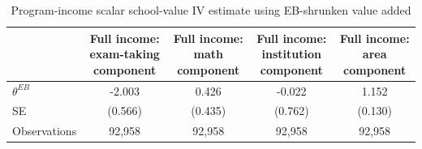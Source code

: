 \begin{table}[!htbp]
\centering
\caption{Program-income scalar school-value IV estimate using EB-shrunken value added}
\label{tab:scalar_school_value_iv_program_income_expected_va_eb}
\begin{tabular}{lcccc}
\toprule
 & Full income: exam-taking component & Full income: math component & Full income: institution component & Full income: area component \\
\midrule
$\theta^{EB}$ & -2.003 & 0.426 & -0.022 & 1.152 \\
SE & (0.566) & (0.435) & (0.762) & (0.130) \\
Observations & 92,958 & 92,958 & 92,958 & 92,958 \\
\bottomrule
\end{tabular}
\end{table}
